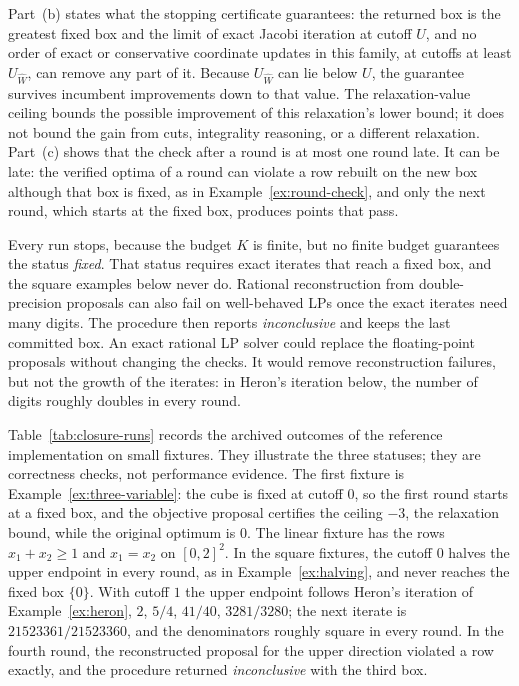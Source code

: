 Part~(b) states what the stopping certificate guarantees: the returned box
is the greatest fixed box and the limit of exact Jacobi iteration at cutoff
$U$, and no order of exact or conservative coordinate updates in this family,
at cutoffs at least $U_{\widehat W}$, can remove any part of it. Because
$U_{\widehat W}$ can lie below $U$, the guarantee survives incumbent
improvements down to that value. The relaxation-value ceiling bounds the
possible improvement of this
relaxation's lower bound; it does not bound the gain from cuts, integrality
reasoning, or a different relaxation. Part~(c) shows that the check after a
round is at most one round late. It can be late: the verified optima of a
round can violate a row rebuilt on the new box although that box is fixed, as
in Example~\ref{ex:round-check}, and only the next round, which starts at the
fixed box, produces points that pass.

Every run stops, because the budget $K$ is finite, but no finite budget
guarantees the status \emph{fixed}. That status requires exact iterates that
reach a fixed box, and the square examples below never do. Rational
reconstruction from double-precision proposals can also fail on
well-behaved LPs once the exact iterates need many digits. The procedure
then reports \emph{inconclusive} and keeps the last committed box. An exact
rational LP solver could replace
the floating-point proposals without changing the checks. It would remove
reconstruction failures, but not the growth of the iterates: in Heron's
iteration below, the number of digits roughly doubles in every round.

Table~\ref{tab:closure-runs} records the archived outcomes of the reference
implementation on small fixtures. They illustrate the three statuses; they are
correctness checks, not performance evidence. The first fixture is
Example~\ref{ex:three-variable}: the cube is fixed at cutoff $0$, so the first
round starts at a fixed box, and the objective proposal certifies the ceiling
$-3$, the relaxation bound, while the original optimum is $0$. The linear
fixture has the rows $x_1+x_2\ge1$ and $x_1=x_2$ on $[0,2]^2$. In the square
fixtures, the cutoff $0$ halves the upper endpoint in every round, as in
Example~\ref{ex:halving}, and never reaches the fixed box $\{0\}$. With cutoff
$1$ the upper endpoint follows Heron's iteration of Example~\ref{ex:heron},
$2$, $5/4$, $41/40$, $3281/3280$; the next iterate is $21523361/21523360$, and
the denominators roughly square in every round. In the fourth round, the
reconstructed proposal for the upper direction violated a row exactly, and the
procedure returned \emph{inconclusive} with the third box.


